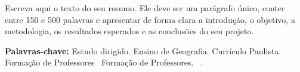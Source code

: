 
\newcommand{\palavrachaveum}{Estudo dirigido}
\newcommand{\palavrachavedois}{Ensino de Geografia}
\newcommand{\palavrachavetres}{Currículo Paulista}
\newcommand{\palavrachavequatro}{Formação de Professores}
\newcommand{\palavrachavecinco}{} %

\begin{resumo}

\setlength{\parindent}{0pt}
\setlength{\parskip}{0pt}
\singlespacing
\normalsize

Escreva aqui o texto do seu resumo. Ele deve ser um parágrafo único, conter entre 150 e 500 palavras e apresentar de forma clara a introdução, o objetivo, a metodologia, os resultados esperados e as conclusões do seu projeto.

\vspace{0.5cm}

{\normalsize\bfseries Palavras-chave:} \normalsize
\palavrachaveum. \palavrachavedois. \palavrachavetres.%
\ifx\palavrachavequatro\empty\else
    \ \palavrachavequatro.%
\fi
\ifx\palavrachavecinco\empty\else
    \ \palavrachavecinco.%
\fi

\end{resumo}

